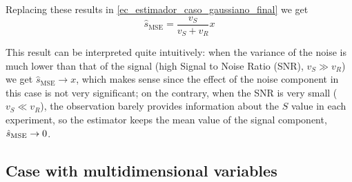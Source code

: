 \begin{example}
Replacing these results in \eqref{ec_estimador_caso_gaussiano_final} we get
\begin{equation}
\hat s_{\text{MSE}} = \frac{v_S}{v_S + v_R} x
\end{equation}

This result can be interpreted quite intuitively: when the variance of the noise is much lower than that of the signal (high Signal to Noise Ratio (SNR), $v_S \gg v_R$) we get $\hat s_{\text{MSE}} \to x$, which makes sense since the effect of the noise component in this case is not very significant; on the contrary, when the SNR is very small ($v_S \ll v_R$), the observation barely provides information about the $S$ value in each experiment, so the estimator keeps the mean value of the signal component, $\hat{s}_\text{MSE} \to 0$.
\end{example} %


\subsection{Case with multidimensional variables}

